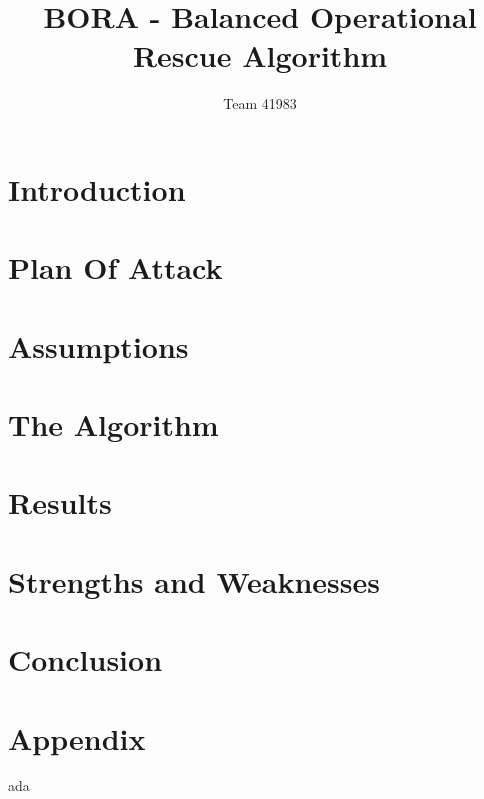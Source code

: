 \documentclass[12pt]{article}
\title{BORA - Balanced Operational Rescue Algorithm}
\author{Team 41983}
\date{}                                           %
\begin{document}
\setlength{\parindent}{0cm}
\abstract

\newpage

\tableofcontents

\maketitle

\section{Introduction}

\newpage
\section{Plan Of Attack}

\newpage
\section{Assumptions}

\newpage
\section{The Algorithm}

\newpage
\section{Results}

\newpage
\section{Strengths and Weaknesses}

\newpage
\section{Conclusion}

\newpage
\section{Appendix}

ada
\end{document}
